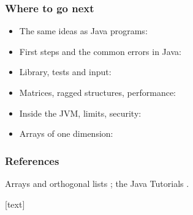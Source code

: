 \documentclass[aspectratio=169,10pt,compress]{beamer}
\begin{document}
\begin{frame}[t,fragile] \frametitle{Where to go next}
	\begin{itemize}
		\item The same ideas as Java programs: 
		\item First steps and the common errors in Java: 
		\item Library, tests and input: 
		\item Matrices, ragged structures, performance: 
		\item Inside the JVM, limits, security: 
		\item Arrays of one dimension: 
	\end{itemize}
\end{frame}




\begin{frame}[t,fragile] \frametitle{References}
	\small Arrays and orthogonal lists \cite{knuth1973artv1}; the Java Tutorials \cite{TheJavaTutorialsArray}.

	\vspace{1em}
	[text]
	
	\tiny
\end{frame}




\begin{frame}[t,fragile]
	\begin{center}
		\vspace{4cm}
	\end{center}
\end{frame}
\end{document}
